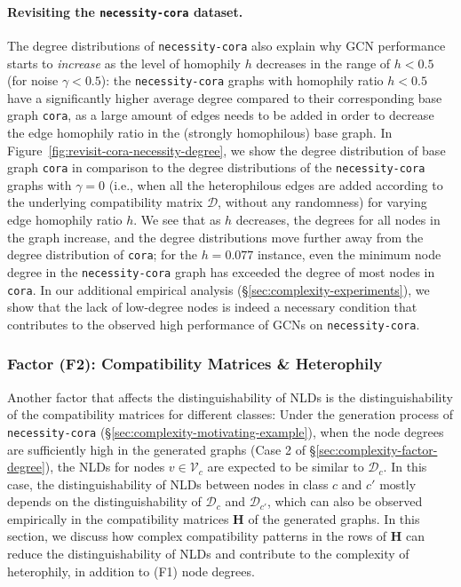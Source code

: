 \paragraph{Revisiting the \texttt{necessity-cora} dataset.} 
The degree distributions of \texttt{necessity-cora} also explain why GCN performance starts to \emph{increase} as the level of homophily $h$ decreases in the range of $h<0.5$ (for noise $\gamma < 0.5$): the \texttt{necessity-cora} graphs with homophily ratio $h<0.5$ have a significantly higher average degree compared to their corresponding base graph \texttt{cora}, as a large amount of edges needs to be added in order to decrease the edge homophily ratio in the (strongly homophilous) base graph. In Figure~\ref{fig:revisit-cora-necessity-degree}, we show the degree distribution of base graph \texttt{cora} in comparison to the degree distributions of the \texttt{necessity-cora} graphs with $\gamma=0$ (i.e., when all the heterophilous edges are added according to the underlying compatibility matrix $\mathcal{D}$, without any randomness) for varying edge homophily ratio $h$. We see that as $h$ decreases, the degrees for all nodes in the graph increase, and the degree distributions move further away from the degree distribution of \texttt{cora}; for the $h=0.077$ instance, even the minimum node degree in the \texttt{necessity-cora} graph has exceeded the degree of most nodes in \texttt{cora}. In our additional empirical analysis (\S\ref{sec:complexity-experiments}), we show that the lack of low-degree nodes is indeed a necessary condition that contributes to the observed high performance of GCNs on \texttt{necessity-cora}.

\subsubsection{Factor (F2): Compatibility Matrices \& Heterophily}
\label{sec:complexity-factor-compatibility}

Another factor that affects the distinguishability of NLDs is the distinguishability of the compatibility matrices for different classes: 
Under the generation process of \texttt{necessity-cora} (\S\ref{sec:complexity-motivating-example}),
when the node degrees are sufficiently high in the generated graphs (Case 2 of \S\ref{sec:complexity-factor-degree}), the NLDs for nodes $v \in \mathcal{V}_c$ are expected to be similar to $\mathcal{D}_c$. 
In this case, the distinguishability of NLDs between nodes in class $c$ and $c'$ mostly depends on the distinguishability of $\mathcal{D}_c$ and $\mathcal{D}_{c'}$, which can also be observed empirically in the compatibility matrices $\mathbf{H}$ of the generated graphs.
In this section, we discuss how complex compatibility patterns in the rows of $\mathbf{H}$ can
reduce the distinguishability of NLDs and contribute to the complexity of heterophily, in addition to (F1) node degrees.



